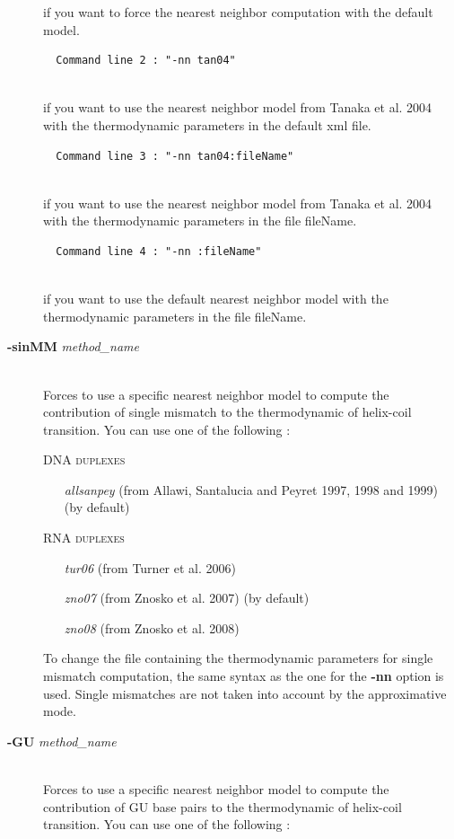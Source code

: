 \documentclass{article}
\begin{document}
\begin{description}
\begin{verbatim}
  \end{verbatim}
  if you want to force the nearest neighbor computation with the default model.
  
  \begin{verbatim}
  Command line 2 : "-nn tan04" 
  
  \end{verbatim}
  if you want to use the nearest neighbor model from Tanaka et al. 2004 with the 
  thermodynamic parameters in the default xml file.
  
  \begin{verbatim}
  Command line 3 : "-nn tan04:fileName" 
  
  \end{verbatim}
  if you want to use the nearest neighbor model from Tanaka et al. 2004 with the 
  thermodynamic parameters in the file fileName.
  
  \begin{verbatim}
  Command line 4 : "-nn :fileName" 
  
  \end{verbatim}
  if you want to use the default nearest neighbor model with the thermodynamic parameters in the file fileName.
  		  
\item [\textbf{-sinMM} \textit{method\_name}]\mbox{}\\ 
  Forces to use a specific nearest neighbor model to compute the contribution of single mismatch to the thermodynamic of helix-coil transition. 
  You can use one of the following :
  
  \textsc{DNA duplexes}
    \begin{itemize}
    \item [\textit{allsanpey}] (from Allawi, Santalucia and Peyret 1997, 1998 and 1999)  (by default) 
    \end{itemize}
  \textsc{RNA duplexes}
    \begin{itemize}
    \item [\textit{tur06}] (from Turner et al. 2006)
    \item [\textit{zno07}] (from Znosko et al. 2007)  (by default)
    \item [\textit{zno08}] (from Znosko et al. 2008)		 		 
    \end{itemize}
  To change the file containing the thermodynamic parameters for single mismatch computation, the same syntax as the one for the \textbf{-nn} option is used.
  Single mismatches are not taken into account by the approximative mode.
\item [\textbf{-GU} \textit{method\_name}]\mbox{}\\ 
  Forces to use a specific nearest neighbor model to compute the contribution of GU base pairs to the thermodynamic of helix-coil transition. 
  You can use one of the following :
  

\end{description}
\end{document}
